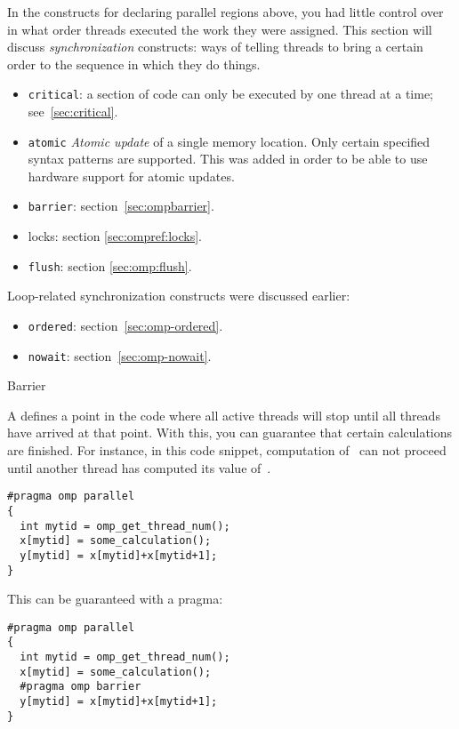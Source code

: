 

In the constructs for declaring parallel regions above, you had little control over 
in what order threads executed the work they were assigned.
This section will discuss \emph{synchronization} constructs: ways of telling
threads to bring a certain order to the sequence in which they do things.

\begin{itemize}
\item \texttt{critical}: a section of code can only be executed by one
  thread at a time; see~\ref{sec:critical}.
\item \texttt{atomic} \emph{Atomic update}
  of a single memory location. Only certain
  specified syntax patterns are supported. This was added in order to
  be able to use hardware support for atomic updates.
\item \texttt{barrier}: section~\ref{sec:ompbarrier}.
\item locks: section \ref{sec:ompref:locks}.
\item \texttt{flush}: section \ref{sec:omp:flush}.
\end{itemize}
Loop-related synchronization constructs were discussed earlier:
\begin{itemize}
\item \texttt{ordered}: section~\ref{sec:omp-ordered}.
\item \texttt{nowait}: section~\ref{sec:omp-nowait}.
\end{itemize}

 {Barrier}
\label{sec:ompbarrier}

A  defines a point in the code where all active threads will stop
until all threads have arrived at that point. With this, you can guarantee that
certain calculations are finished. For instance, in this code snippet, computation 
of~ can not proceed until another thread has computed its value of~.
\begin{lstlisting}[language=omp]
#pragma omp parallel 
{
  int mytid = omp_get_thread_num();
  x[mytid] = some_calculation();
  y[mytid] = x[mytid]+x[mytid+1];
}
\end{lstlisting}
This can be guaranteed with a  pragma:
\begin{lstlisting}[language=omp]
#pragma omp parallel 
{
  int mytid = omp_get_thread_num();
  x[mytid] = some_calculation();
  #pragma omp barrier
  y[mytid] = x[mytid]+x[mytid+1];
}
\end{lstlisting}

